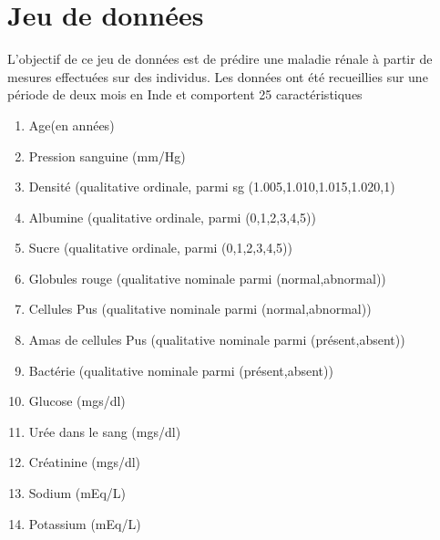 \documentclass[letterpaper,10pt,french]{sphinxmanual}
\begin{document}
\section{Jeu de données}
\label{\detokenize{TP/TP_etudiant:jeu-de-donnees}}
\sphinxAtStartPar
L’objectif de ce jeu de données est de prédire une maladie rénale à partir de mesures effectuées sur des individus.
Les données ont été recueillies sur une période de deux mois en Inde et comportent 25 caractéristiques
\begin{enumerate}
%
\item {} 
\sphinxAtStartPar
Age(en années)

\item {} 
\sphinxAtStartPar
Pression sanguine (mm/Hg)

\item {} 
\sphinxAtStartPar
Densité (qualitative ordinale, parmi sg \sphinxhyphen{} (1.005,1.010,1.015,1.020,1)

\item {} 
\sphinxAtStartPar
Albumine (qualitative ordinale, parmi (0,1,2,3,4,5))

\item {} 
\sphinxAtStartPar
Sucre  (qualitative ordinale, parmi (0,1,2,3,4,5))

\item {} 
\sphinxAtStartPar
Globules rouge (qualitative nominale parmi (normal,abnormal))

\item {} 
\sphinxAtStartPar
Cellules Pus (qualitative nominale parmi (normal,abnormal))

\item {} 
\sphinxAtStartPar
Amas de cellules Pus (qualitative nominale parmi (présent,absent))

\item {} 
\sphinxAtStartPar
Bactérie (qualitative nominale parmi (présent,absent))

\item {} 
\sphinxAtStartPar
Glucose (mgs/dl)

\item {} 
\sphinxAtStartPar
Urée dans le sang (mgs/dl)

\item {} 
\sphinxAtStartPar
Créatinine (mgs/dl)

\item {} 
\sphinxAtStartPar
Sodium (mEq/L)

\item {} 
\sphinxAtStartPar
Potassium (mEq/L)


\end{enumerate}
\end{document}
